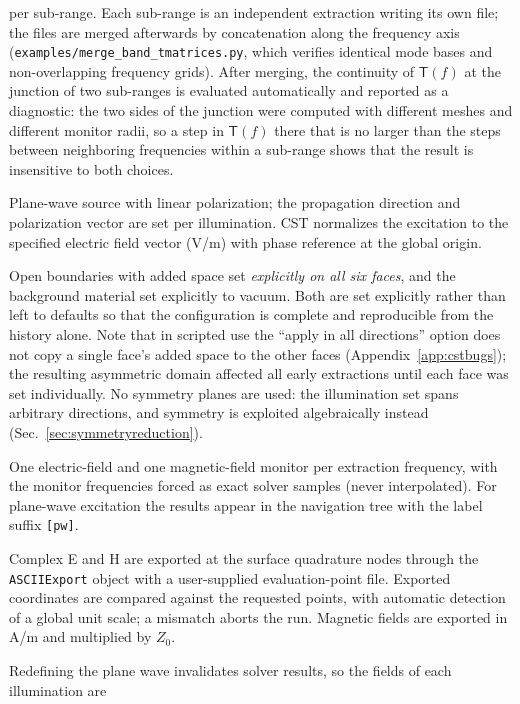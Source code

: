 \documentclass[11pt]{article}
\begin{document}
\begin{description}
per sub-range.  Each sub-range is an independent extraction writing
its own file; the files are merged afterwards by concatenation along
the frequency axis (\texttt{examples/merge\_band\_tmatrices.py}, which
verifies identical mode bases and non-overlapping frequency grids).
After merging, the continuity of $\mathsf{T}(f)$ at the junction of
two sub-ranges is evaluated automatically and reported as a
diagnostic: the two sides of the junction were computed with different
meshes and different monitor radii, so a step in $\mathsf{T}(f)$ there
that is no larger than the steps between neighboring frequencies
within a sub-range shows that the result is insensitive to both
choices.
\item[Excitation.]  Plane-wave source with linear polarization; the
propagation direction and polarization vector are set per illumination.
CST normalizes the excitation to the specified electric field vector
(V/m) with phase reference at the global origin.
\item[Boundaries and background.]  Open boundaries with added space set
\emph{explicitly on all six faces}, and the background material set
explicitly to vacuum.  Both are set explicitly rather than left to
defaults so that the configuration is complete and reproducible from
the history alone.  Note that in scripted use the ``apply in all
directions'' option does not copy a single face's added space to the
other faces (Appendix~\ref{app:cstbugs}); the resulting asymmetric
domain affected all early extractions until each face was set
individually.  No symmetry planes are used: the illumination set spans
arbitrary directions, and symmetry is exploited algebraically instead
(Sec.~\ref{sec:symmetryreduction}).
\item[Monitors.]  One electric-field and one magnetic-field monitor per
extraction frequency, with the monitor frequencies forced as exact solver
samples (never interpolated).  For plane-wave excitation the results
appear in the navigation tree with the label suffix \texttt{[pw]}.
\item[Field export.]  Complex E and H are exported at the surface
quadrature nodes through the \texttt{ASCIIExport} object with a
user-supplied evaluation-point file.  Exported coordinates are compared
against the requested points, with automatic detection of a global unit
scale; a mismatch aborts the run.  Magnetic fields are exported in A/m
and multiplied by $Z_0$.
\item[Result lifetime and caching.]  Redefining the plane wave
invalidates solver results, so the fields of each illumination are

\end{description}
\end{document}
